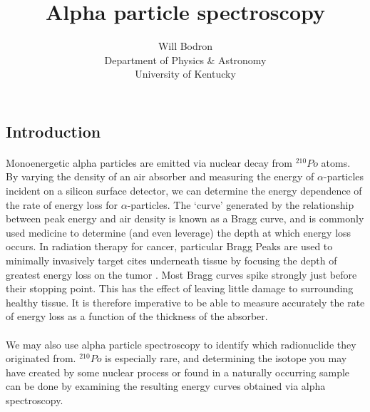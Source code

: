 \documentclass[12pt]{article}
\title{Alpha particle spectroscopy}
\author{Will Bodron \\ Department of Physics \& Astronomy \\ University of Kentucky}
\begin{document}
\maketitle


\begin{multicols}{2}

    \section{Introduction}
    \paragraph{} Monoenergetic alpha particles are emitted via nuclear decay from ${}^{210}Po$ atoms. By varying the density of an air absorber and measuring the energy of $\alpha$-particles incident on a silicon surface detector, we can determine the energy dependence of the rate of energy loss for $\alpha$-particles. \cite{kovash} The `curve' generated by the relationship between peak energy and air density is known as a Bragg curve, and is commonly used medicine to determine (and even leverage) the depth at which energy loss occurs. In radiation therapy for cancer, particular Bragg Peaks are used to minimally invasively target cites underneath tissue by focusing the depth of greatest energy loss on the tumor \cite{brookhaven}. Most Bragg curves spike strongly just before their stopping point. This has the effect of leaving little damage to surrounding healthy tissue. It is therefore imperative to be able to measure accurately the rate of energy loss as a function of the thickness of the absorber.
    \paragraph{} We may also use alpha particle spectroscopy to identify which radionuclide they originated from. ${}^{210}Po$ is especially rare, and determining the isotope you may have created by some nuclear process or found in a naturally occurring sample can be done by examining the resulting energy curves obtained via alpha spectroscopy.


\end{multicols}
\end{document}
